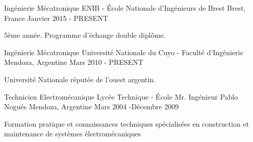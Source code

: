 
\begin{cventries}
  \cventry
    {Ingénierie Mécatronique} %
    {ENIB - École Nationale d'Ingénieurs de Brest} %
    {Brest, France} %
    {Janvier 2015 - PRESENT} %
    {
      \begin{cvitems} %
        \item {5ème année. Programme d'échange double diplôme.}
      \end{cvitems}
    }

\cventry
{Ingénierie Mécatronique} %
{Université Nationale du Cuyo - Faculté d'Ingénierie} %
{Mendoza, Argentine} %
{Mars 2010 - PRESENT} %
{
	\begin{cvitems} %
		\item {Université Nationale réputée de l'ouest argentin.}
	\end{cvitems}
}


\cventry
{Technicien Electromécanique} %
{Lycée Technique - École Mr. Ingénieur Pablo Nogués} %
{Mendoza, Argentine} %
{Mars 2004 -Décembre 2009} %
{
	\begin{cvitems} %
		\item { Formation pratique et connaissances techniques spécialisées en construction et maintenance de systèmes électromécaniques}
	\end{cvitems}
}






\end{cventries}
